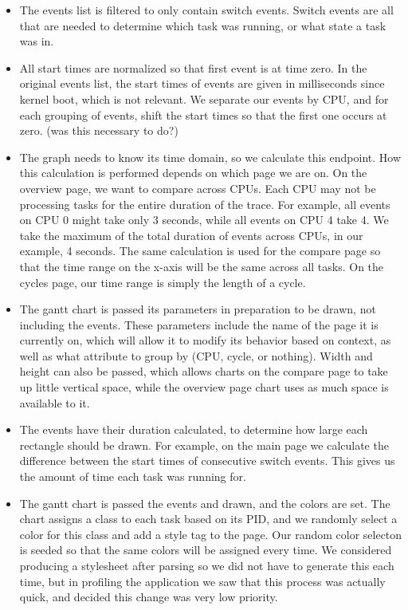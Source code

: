 \documentclass{hmcclinic}
\begin{document}
  \begin{itemize}

    \item The events list is filtered to only contain switch events. Switch
      events are all that are needed to determine which task was running, or
      what state a task was in.
  
    \item All start times are normalized so that first event is at time zero.
      In the original events list, the start times of events are given in
      milliseconds since kernel boot, which is not relevant. We separate our
      events by CPU, and for each grouping of events, shift the start times
      so that the first one occurs at zero. (was this necessary to do?)
  
    \item The graph needs to know its time domain, so we calculate this
      endpoint. How this calculation is performed depends on which page we are
      on. On the overview page, we want to compare across CPUs. Each CPU may not
      be processing tasks for the entire duration of the trace. For example, all
      events on CPU 0 might take only 3 seconds, while all events on CPU 4 take
      4. We take the maximum of the total duration of events across CPUs, in our
      example, 4 seconds. The same calculation is used for the compare page so
      that the time range on the x-axis will be the same across all tasks.  On
      the cycles page, our time range is simply the length of a cycle.
  
    \item The gantt chart is passed its parameters in preparation to be drawn,
      not including the events. These parameters include the name of the page it
      is currently on, which will allow it to modify its behavior based on
      context, as well as what attribute to group by (CPU, cycle, or nothing).
      Width and height can also be passed, which allows charts on the compare
      page to take up little vertical space, while the overview page chart uses
      as much space is available to it.
  
   \item The events have their duration calculated, to determine how large each
     rectangle should be drawn. For example, on the main page we calculate the
     difference between the start times of consecutive switch events. This gives
     us the amount of time each task was running for.
  
   \item The gantt chart is passed the events and drawn, and the colors are set.
     The chart assigns a class to each task based on its PID, and we randomly
     select a color for this class and add a style tag to the page. Our random
     color selecton is seeded so that the same colors will be assigned every
     time. We considered producing a stylesheet after parsing so we did not have
     to generate this each time, but in profiling the application we saw that
     this process was actually quick, and decided this change was very low
     priority.

  \end{itemize}
\end{document}
